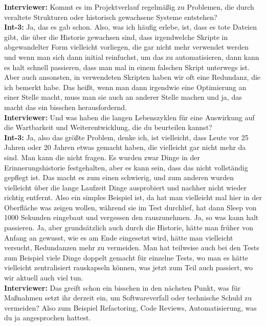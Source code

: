 \textbf{Interviewer:} Kommt es im Projektverlauf regelmäßig zu Problemen, die durch veraltete Strukturen oder historisch gewachsene Systeme entstehen?\\
\textbf{Int-3:} Ja, das es gab schon. Also, was ich häufig erlebe, ist, dass es tote Dateien gibt, die über die Historie gewachsen sind, dass irgendwelche Skripte in abgewandelter Form vielleicht vorliegen, die gar nicht mehr verwendet werden und wenn man sich dann initial reinfuchst, um das zu automatisieren, dann kann es halt schnell passieren, dass man mal in einem falschen Skript unterwegs ist. Aber auch ansonsten, in verwendeten Skripten haben wir oft eine Redundanz, die ich bemerkt habe. Das heißt, wenn man dann irgendwie eine Optimierung an einer Stelle macht, muss man sie auch an anderer Stelle machen und ja, das macht das ein bisschen herausfordernd. \\
\textbf{Interviewer:} Und was haben die langen Lebenszyklen für eine Auswirkung auf die Wartbarkeit und Weiterentwicklung, die du beurteilen kannst?\\
\textbf{Int-3:} Ja, also das größte Problem, denke ich, ist vielleicht, dass Leute vor 25 Jahren oder 20 Jahren etwas gemacht haben, die vielleicht gar nicht mehr da sind. Man kann die nicht fragen. Es wurden zwar Dinge in der Erinnerungshistorie festgehalten, aber es kann sein, dass das nicht vollständig gepflegt ist. Das macht es zum einen schwierig, und zum anderen wurden vielleicht über die lange Laufzeit Dinge ausprobiert und nachher nicht wieder richtig entfernt. Also ein simples Beispiel ist, da hat man vielleicht mal hier in der Oberfläche was zeigen wollen, während sie im Test durchlief, hat dann Sleep von 1000 Sekunden eingebaut und vergessen den rauszunehmen. Ja, so was kann halt passieren. Ja, aber grundsätzlich auch durch die Historie, hätte man früher von Anfang an gewusst, wie es am Ende eingesetzt wird, hätte man vielleicht versucht, Redundanzen mehr zu vermeiden. Man hat teilweise auch bei den Tests zum Beispiel viele Dinge doppelt gemacht für einzelne Tests, wo man es hätte vielleicht zentralisiert rauskapseln können, was jetzt zum Teil auch passiert, wo wir aktuell auch viel tun. \\
\textbf{Interviewer:} Das greift schon ein bisschen in den nächsten Punkt, was für Maßnahmen setzt ihr derzeit ein, um Softwareverfall oder technische Schuld zu vermeiden? Also zum Beispiel Refactoring, Code Reviews, Automatisierung, was du ja angesprochen hattest.\\
